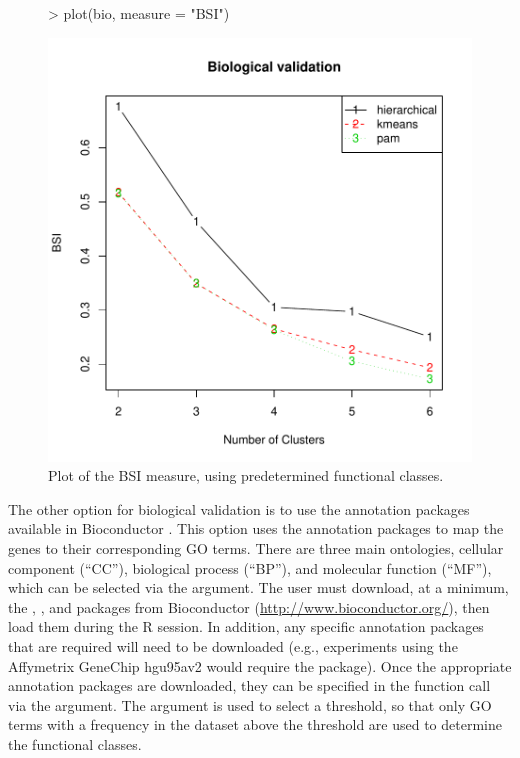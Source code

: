 \documentclass[11pt]{article}
\begin{document}
\begin{figure}
  \centering
\begin{Schunk}
\begin{Sinput}
> plot(bio, measure = "BSI")
\end{Sinput}
\end{Schunk}
\includegraphics{clValid-016}
  \caption{Plot of the BSI measure, using predetermined functional classes.}
  \label{fig:BSI}
\end{figure}



The other option for biological validation is to use the annotation packages available in
Bioconductor \citep{BioC}.  This option uses the annotation packages
to map the genes to their corresponding GO terms.  There
are three main ontologies, cellular component (``CC''), biological process
(``BP''), and molecular function (``MF''), which can be selected via
the  argument.
The user must download, at a
minimum, the , , and  packages from
Bioconductor
(\href{http://www.bioconductor.org/}{http://www.bioconductor.org/}),
then load them during the R session.
In addition, any specific annotation packages that are required will need to be downloaded (e.g.,
experiments using the Affymetrix GeneChip hgu95av2 would require the
 package).  
Once the appropriate annotation packages are downloaded, they can be
specified in the function call via the  argument.
The  argument is used to select a threshold, so that
only GO terms with a frequency in the dataset above the threshold are
used to determine the functional classes.  
\end{document}
